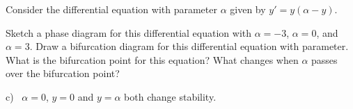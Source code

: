 \begin{exercise}
Consider the differential equation with parameter $\alpha$ given by $y' = y(\alpha - y)$. 
\begin{tasks}
\task Sketch a phase diagram for this differential equation with $\alpha = -3$, $\alpha = 0$, and $\alpha = 3$. 
\task Draw a bifurcation diagram for this differential equation with parameter. 
\task What is the bifurcation point for this equation? What changes when $\alpha$ passes over the bifurcation point?
\end{tasks}
\end{exercise}
\comboSol{%
}
{%
c)~ $\alpha = 0$, $y=0$ and $y=\alpha$ both change stability.
}

\setcounter{exercise}{100}
